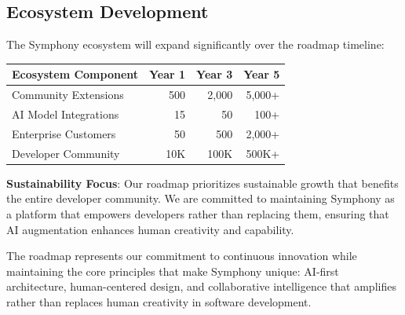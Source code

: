 \subsection*{Ecosystem Development}

The Symphony ecosystem will expand significantly over the roadmap timeline:

\begin{center}
\begin{tabular}{@{}lrrr@{}}
\toprule
\textbf{Ecosystem Component} & \textbf{Year 1} & \textbf{Year 3} & \textbf{Year 5} \\
\midrule
Community Extensions & 500 & 2,000 & 5,000+ \\
AI Model Integrations & 15 & 50 & 100+ \\
Enterprise Customers & 50 & 500 & 2,000+ \\
Developer Community & 10K & 100K & 500K+ \\
\bottomrule
\end{tabular}
\end{center}

\begin{alertbox}
\textbf{Sustainability Focus}: Our roadmap prioritizes sustainable growth that benefits the entire developer community. We are committed to maintaining Symphony as a platform that empowers developers rather than replacing them, ensuring that AI augmentation enhances human creativity and capability.
\end{alertbox}

The roadmap represents our commitment to continuous innovation while maintaining the core principles that make Symphony unique: AI-first architecture, human-centered design, and collaborative intelligence that amplifies rather than replaces human creativity in software development.